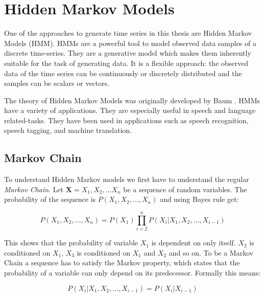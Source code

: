 
\chapter{Hidden Markov Models}\label{chapter:hmm}

One of the approaches to generate time series in this thesis are Hidden Markov Models (HMM). HMMs are a powerful tool to model observed data samples of a discrete time-series. They are a generative model which makes them inherently suitable for the task of generating data. It is a flexible approach: the observed data of the time series can be continuously or discretely distributed and the samples can be scalars or vectors. 

The theory of Hidden Markov Models was originally developed by Baum \parencite{baum1972inequality}. HMMs have a variety of applications. They are especially useful in speech and language related-tasks. They have been used in applications such as speech recognition, speech tagging, and machine translation\parencite{huang2001spoken}.

\section{Markov Chain}
To understand Hidden Markov models we first have to understand the regular \emph{Markov Chain}. Let $\mathbf{X}=X_{1}, X_{2}, \ldots X_{n}$ be a sequence of random variables. The probability of the sequence is $P\left(X_{1}, X_{2}, \ldots, X_{n}\right)$ and using Bayes rule get: 

\begin{equation}
P\left(X_{1}, X_{2}, \ldots, X_{n}\right)=P\left(X_{1}\right) \prod_{i=2}^{n} P\left(X_{i} |X_{1}, X_{2}, \ldots, X_{i-1}\right)
\end{equation}

This shows that the probability of variable $X_1$ is dependent on only itself. $X_2$ is conditioned on $X_1$, $X_3$ is conditioned on $X_1$ and $X_2$ and so on. To be a Markov Chain a sequence has to satisfy the Markov property, which states that the probability of a variable can only depend on its predecessor. Formally this means: 

\begin{equation}
P\left(X_{i} | X_{1}, X_{2}, \ldots, X_{i-1}\right)=P\left(X_{i} | X_{i-1}\right)
\end{equation}

